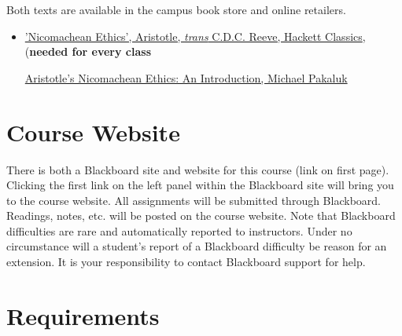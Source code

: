 \documentclass[article,oneside]{memoir}
\begin{document}
Both texts are available in the campus book store and online retailers.

\begin{itemize}
\item
\href{https://www.amazon.com/Nicomachean-Ethics-Hackett-Classics-Aristotle/dp/1624661173/ref=sr_1_16?ie=UTF8&qid=1473024493&sr=8-16&keywords=aristotle%27s+nicomachean+ethics}{'Nicomachean Ethics', Aristotle, \emph{trans} C.D.C. Reeve, Hackett Classics}, (\textbf{needed for every class}

  \href{https://www.amazon.com/Aristotles-Nicomachean-Ethics-Introductions-Philosophical/dp/0521520681/ref=sr_1_1?ie=UTF8&qid=1473039378&sr=8-1&keywords=nicomachean+ethics+pakaluk}{Aristotle's Nicomachean Ethics: An Introduction, Michael Pakaluk} 
\end{itemize}


\section{Course Website}
There is both a Blackboard site and website for this course (link on first page). Clicking the first link on the left panel within the Blackboard site will bring you to the course website. All assignments will be submitted through Blackboard. Readings, notes, etc. will be posted on the course website. Note that Blackboard difficulties are rare and automatically reported to instructors. Under no circumstance will a student's report of a Blackboard difficulty be reason for an extension. It is your responsibility to contact Blackboard support for help.




\section{Requirements}
\end{document}
